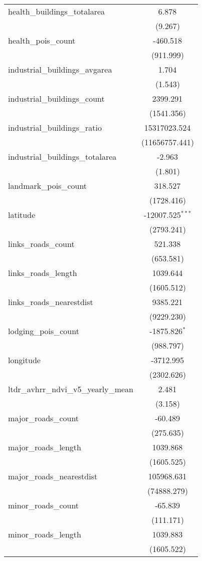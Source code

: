 \begin{table}[!htbp]
\begin{tabular}{@{\extracolsep{5pt}}lc}
 health_buildings_totalarea & 6.878$^{}$ \\
  & (9.267) \\
 health_pois_count & -460.518$^{}$ \\
  & (911.999) \\
 industrial_buildings_avgarea & 1.704$^{}$ \\
  & (1.543) \\
 industrial_buildings_count & 2399.291$^{}$ \\
  & (1541.356) \\
 industrial_buildings_ratio & 15317023.524$^{}$ \\
  & (11656757.441) \\
 industrial_buildings_totalarea & -2.963$^{}$ \\
  & (1.801) \\
 landmark_pois_count & 318.527$^{}$ \\
  & (1728.416) \\
 latitude & -12007.525$^{***}$ \\
  & (2793.241) \\
 links_roads_count & 521.338$^{}$ \\
  & (653.581) \\
 links_roads_length & 1039.644$^{}$ \\
  & (1605.512) \\
 links_roads_nearestdist & 9385.221$^{}$ \\
  & (9229.230) \\
 lodging_pois_count & -1875.826$^{*}$ \\
  & (988.797) \\
 longitude & -3712.995$^{}$ \\
  & (2302.626) \\
 ltdr_avhrr_ndvi_v5_yearly_mean & 2.481$^{}$ \\
  & (3.158) \\
 major_roads_count & -60.489$^{}$ \\
  & (275.635) \\
 major_roads_length & 1039.868$^{}$ \\
  & (1605.525) \\
 major_roads_nearestdist & 105968.631$^{}$ \\
  & (74888.279) \\
 minor_roads_count & -65.839$^{}$ \\
  & (111.171) \\
 minor_roads_length & 1039.883$^{}$ \\
  & (1605.522) \\

\end{tabular}
\end{table}
